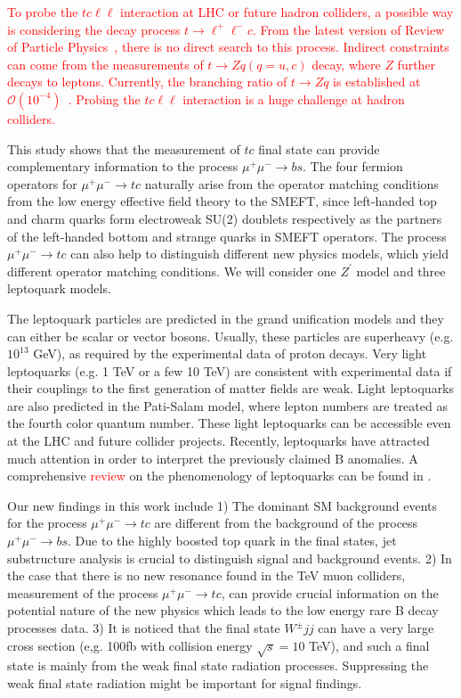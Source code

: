 \documentclass[a4paper,11pt]{article}
\begin{document}
\textcolor{red}{
To probe the $tc\ell\ell$ interaction at LHC or future hadron colliders,    
a possible way is considering the decay process $t\to \ell^+\ell^-c$.
From the latest version of Review of Particle Physics~\cite{ParticleDataGroup:2022pth}, 
there is no direct search to this process. 
Indirect constraints can come from the measurements of $t\to Zq(q=u,c)$ decay, 
where $Z$ further decays to leptons. 
Currently, the branching ratio of $t\to Zq$ is established at $\mathcal{O}(10^{-4})$~\cite{ATLAS:2015vhj,CMS:2017wcz,ATLAS:2018zsq}.
Probing the $tc\ell\ell$ interaction is a huge challenge at hadron colliders. 
}

This study shows that the measurement of $tc$ final state can provide complementary information to the process $\mu^+\mu^-\to b s$.
The four fermion operators for $\mu^+\mu^-\to tc$ naturally arise from the operator matching conditions from the low energy effective field theory to the SMEFT, 
since left-handed top and charm quarks form electroweak SU(2) doublets respectively as the partners of the left-handed bottom and strange quarks in SMEFT operators. 
The process $\mu^+\mu^-\to tc$ can also help to distinguish different new physics models, which yield different operator matching conditions. 
We will consider one $Z^\prime$ model and three leptoquark models.
 
The leptoquark particles are predicted in the grand unification models and they can either be scalar or vector bosons. 
Usually, these particles are superheavy (e.g. $10^{13}$ GeV), as required by the experimental data of proton decays. 
Very light leptoquarks (e.g. 1 TeV or a few 10 TeV) are consistent with experimental data if their couplings to the first generation of matter fields are weak. 
Light leptoquarks are also predicted in the Pati-Salam model, where lepton numbers are treated as the fourth color quantum number. 
These light leptoquarks can be accessible even at the LHC and future collider projects. 
Recently, leptoquarks have attracted much attention in order to interpret the previously claimed B anomalies. 
A comprehensive \textcolor{red}{review} on the phenomenology of leptoquarks can be found in \cite{Dorsner:2016wpm}.

Our new findings in this work include 
1) The dominant SM background events for the process $\mu^+\mu^-\to tc$ are different from the background of the process $\mu^+\mu^-\to bs$. 
Due to the highly boosted top quark in the final states, jet substructure analysis is crucial to distinguish signal and background events. 
2) In the case that there is no new resonance found in the TeV muon colliders, measurement of the process $\mu^+\mu^-\to tc$, 
can provide crucial information on the potential nature of the new physics which leads to the low energy rare B decay processes data. 
3) It is noticed that the final state $W^\pm jj $ can have a very large cross section (e,g. 100fb with collision energy $\sqrt{s}=10$ TeV), 
and such a final state is mainly from the weak final state radiation processes. 
Suppressing the weak final state radiation might be important for signal findings.
\end{document}
